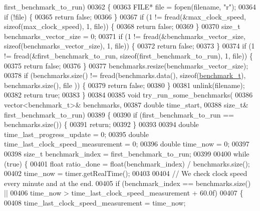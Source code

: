 \begin{DoxyCode}
      first\_benchmark\_to\_run)
00362 \{
00363   FILE* file = fopen(filename, \textcolor{stringliteral}{"r"});
00364   \textcolor{keywordflow}{if} (!file) \{
00365     \textcolor{keywordflow}{return} \textcolor{keyword}{false};
00366   \}
00367   \textcolor{keywordflow}{if} (1 != fread(&max\_clock\_speed, \textcolor{keyword}{sizeof}(max\_clock\_speed), 1, file)) \{
00368     \textcolor{keywordflow}{return} \textcolor{keyword}{false};
00369   \}
00370   \textcolor{keywordtype}{size\_t} benchmarks\_vector\_size = 0;
00371   \textcolor{keywordflow}{if} (1 != fread(&benchmarks\_vector\_size, \textcolor{keyword}{sizeof}(benchmarks\_vector\_size), 1, file)) \{
00372     \textcolor{keywordflow}{return} \textcolor{keyword}{false};
00373   \}
00374   \textcolor{keywordflow}{if} (1 != fread(&first\_benchmark\_to\_run, \textcolor{keyword}{sizeof}(first\_benchmark\_to\_run), 1, file)) \{
00375     \textcolor{keywordflow}{return} \textcolor{keyword}{false};
00376   \}
00377   benchmarks.resize(benchmarks\_vector\_size);
00378   \textcolor{keywordflow}{if} (benchmarks.size() != fread(benchmarks.data(), \textcolor{keyword}{sizeof}(\hyperlink{structbenchmark__t}{benchmark\_t}), benchmarks.size(), file
      )) \{
00379     \textcolor{keywordflow}{return} \textcolor{keyword}{false};
00380   \}
00381   unlink(filename);
00382   \textcolor{keywordflow}{return} \textcolor{keyword}{true};
00383 \}
00384 
00385 \textcolor{keywordtype}{void} try\_run\_some\_benchmarks(
00386   vector<benchmark\_t>& benchmarks,
00387   \textcolor{keywordtype}{double} time\_start,
00388   \textcolor{keywordtype}{size\_t}& first\_benchmark\_to\_run)
00389 \{
00390   \textcolor{keywordflow}{if} (first\_benchmark\_to\_run == benchmarks.size()) \{
00391     \textcolor{keywordflow}{return};
00392   \}
00393 
00394   \textcolor{keywordtype}{double} time\_last\_progress\_update = 0;
00395   \textcolor{keywordtype}{double} time\_last\_clock\_speed\_measurement = 0;
00396   \textcolor{keywordtype}{double} time\_now = 0;
00397 
00398   \textcolor{keywordtype}{size\_t} benchmark\_index = first\_benchmark\_to\_run;
00399 
00400   \textcolor{keywordflow}{while} (\textcolor{keyword}{true}) \{
00401     \textcolor{keywordtype}{float} ratio\_done = float(benchmark\_index) / benchmarks.size();
00402     time\_now = timer.getRealTime();
00403 
00404     \textcolor{comment}{// We check clock speed every minute and at the end.}
00405     \textcolor{keywordflow}{if} (benchmark\_index == benchmarks.size() ||
00406         time\_now > time\_last\_clock\_speed\_measurement + 60.0f)
00407     \{
00408       time\_last\_clock\_speed\_measurement = time\_now;

\end{DoxyCode}
